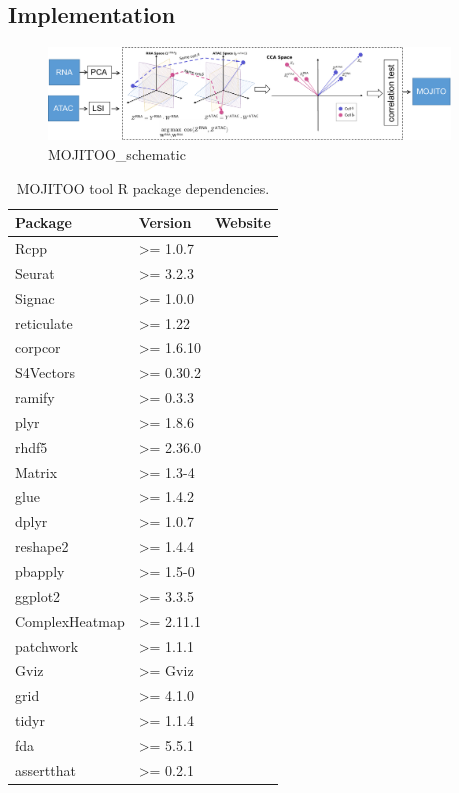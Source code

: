 \subsection{Implementation}

\begin{figure}[!ht]
	\centering
	\includegraphics[width=0.95\textwidth]{MOJITOO_schematic/fig}
	\vspace{0.1cm}
	\caption[MOJITOO\_schematic.]{MOJITOO\_schematic}
	\label{fig:MOJITOO_schematic}
\end{figure}

\begin{table}[!ht]
	\centering
	\begin{tabular}{lll}
		\toprule
		\textbf{Package} & \textbf{Version} & \textbf{Website} \\
		\midrule
		  Rcpp  & >= 1.0.7& \url{} \\
		  Seurat & >= 3.2.3 & \url{} \\
		  Signac & >= 1.0.0& \url{} \\
		  reticulate & >= 1.22& \url{} \\
		  corpcor & >= 1.6.10 & \url{} \\
		  S4Vectors & >= 0.30.2 & \url{} \\
		  ramify & >= 0.3.3 & \url{} \\
		  plyr & >= 1.8.6 & \url{} \\
		  rhdf5 & >= 2.36.0 & \url{} \\
		  Matrix & >= 1.3-4 & \url{} \\
		  glue & >= 1.4.2 & \url{} \\
		  dplyr & >= 1.0.7 & \url{} \\
		  reshape2 & >= 1.4.4 & \url{} \\
		  pbapply & >= 1.5-0 & \url{} \\
		  ggplot2 & >= 3.3.5 & \url{} \\
		  ComplexHeatmap & >= 2.11.1 & \url{} \\
		  patchwork & >= 1.1.1 & \url{} \\
		  Gviz & >= Gviz & \url{} \\
		  grid & >= 4.1.0 & \url{} \\
		  tidyr & >= 1.1.4 & \url{} \\
		  fda & >= 5.5.1 & \url{} \\
		  assertthat & >= 0.2.1 & \url{} \\
		\bottomrule
	\end{tabular}
	\vspace{0.1cm}
	\caption[MOJITOO tool R package dependencies]{MOJITOO tool R package dependencies.}
	\label{tab:mojitoo_R_dependencies}
\end{table}
  

